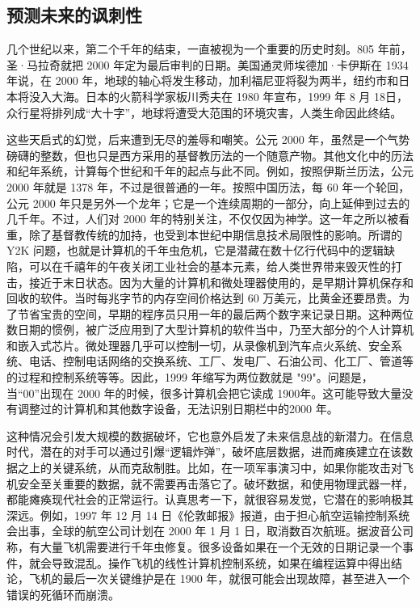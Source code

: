 \subsection{预测未来的讽刺性}
几个世纪以来，第二个千年的结束，一直被视为一个重要的历史时刻。805 年前，圣·马拉奇就把 2000 年定为最后审判的日期。美国通灵师埃德加·卡伊斯在 1934年说，在 2000 年，地球的轴心将发生移动，加利福尼亚将裂为两半，纽约市和日本将没入大海。日本的火箭科学家板川秀夫在 1980 年宣布，1999 年 8 月 18日，众行星将排列成“大十字”，地球将遭受大范围的环境灾害，人类生命因此终结。


这些天启式的幻觉，后来遭到无尽的羞辱和嘲笑。公元 2000 年，虽然是一个气势磅礴的整数，但也只是西方采用的基督教历法的一个随意产物。其他文化中的历法和纪年系统，计算每个世纪和千年的起点与此不同。例如，按照伊斯兰历法，公元 2000 年就是 1378 年，不过是很普通的一年。按照中国历法，每 60 年一个轮回，公元 2000 年只是另外一个龙年；它是一个连续周期的一部分，向上延伸到过去的几千年。不过，人们对 2000 年的特别关注，不仅仅因为神学。这一年之所以被看重，除了基督教传统的加持，也受到本世纪中期信息技术局限性的影响。所谓的 Y2K 问题，也就是计算机的千年虫危机，它是潜藏在数十亿行代码中的逻辑缺陷，可以在千禧年的午夜关闭工业社会的基本元素，给人类世界带来毁灭性的打击，接近于末日状态。因为大量的计算机和微处理器使用的，是早期计算机保存和回收的软件。当时每兆字节的内存空间价格达到 60 万美元，比黄金还要昂贵。为了节省宝贵的空间，早期的程序员只用一年的最后两个数字来记录日期。这种两位数日期的惯例，被广泛应用到了大型计算机的软件当中，乃至大部分的个人计算机和嵌入式芯片。微处理器几乎可以控制一切，从录像机到汽车点火系统、安全系统、电话、控制电话网络的交换系统、工厂、发电厂、石油公司、化工厂、管道等的过程和控制系统等等。因此，1999 年缩写为两位数就是 "99"。问题是，当“00”出现在 2000 年的时候，很多计算机会把它读成 1900年。这可能导致大量没有调整过的计算机和其他数字设备，无法识别日期栏中的2000 年。


这种情况会引发大规模的数据破坏，它也意外启发了未来信息战的新潜力。在信息时代，潜在的对手可以通过引爆“逻辑炸弹”，破坏底层数据，进而瘫痪建立在该数据之上的关键系统，从而克敌制胜。比如，在一项军事演习中，如果你能攻击对飞机安全至关重要的数据，就不需要再击落它了。破坏数据，和使用物理武器一样，都能瘫痪现代社会的正常运行。认真思考一下，就很容易发觉，它潜在的影响极其深远。例如，1997 年 12 月 14 日《伦敦邮报》报道，由于担心航空运输控制系统会出事，全球的航空公司计划在 2000 年 1 月 1 日，取消数百次航班。据波音公司称，有大量飞机需要进行千年虫修复。很多设备如果在一个无效的日期记录一个事件，就会导致混乱。操作飞机的线性计算机控制系统，如果在编程运算中得出结论，飞机的最后一次关键维护是在 1900 年，就很可能会出现故障，甚至进入一个错误的死循环而崩溃。



